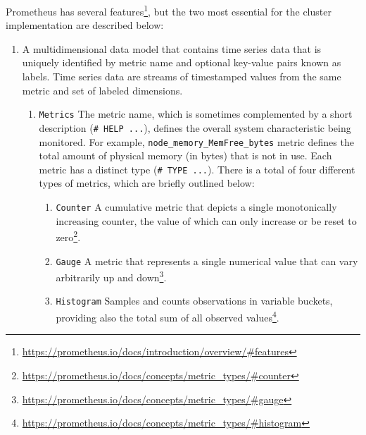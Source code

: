 Prometheus has several features\footnote{\url{https://prometheus.io/docs/introduction/overview/\#features}},
but the two most essential for the cluster implementation are described below\cite{prometheus_overview}:
\begin{enumerate}
  \item A multidimensional data model that contains time series data that is uniquely
    identified by metric name and optional key-value pairs known as labels. Time
    series data are streams of timestamped values from the same metric and set
    of labeled dimensions\cite{prometheus_data_model}.
    \begin{enumerate}
      \item \texttt{Metrics}
        \newline
        The metric name, which is sometimes complemented by a short description (\lstinline[language=prometheus]{# HELP ...}),
        defines the overall system characteristic being monitored.
        \newline
        For example, \lstinline[language=prometheus, alsoletter={_},
        morekeywords={node_memory_MemFree_bytes}]{node_memory_MemFree_bytes}
        metric defines the total amount of physical memory (in bytes) that is
        not in use.
        \newline
        Each metric has a distinct type (\lstinline[language=prometheus]{# TYPE ...}).
        There is a total of four different types of metrics, which are briefly outlined
        below\cite{prometheus_metric_types}:
        \begin{enumerate}
          \item \texttt{Counter}
            \newline
            A cumulative metric that depicts a single monotonically increasing
            counter, the value of which can only increase or be reset to zero\footnote{\url{https://prometheus.io/docs/concepts/metric_types/\#counter}}.

          \item \texttt{Gauge}
            \newline
            A metric that represents a single numerical value that can vary
            arbitrarily up and down\footnote{\url{https://prometheus.io/docs/concepts/metric_types/\#gauge}}.

          \item \texttt{Histogram}
            \newline
            Samples and counts observations in variable buckets, providing also the
            total sum of all observed values\footnote{\url{https://prometheus.io/docs/concepts/metric_types/\#histogram}}.


\end{enumerate}
\end{enumerate}
\end{enumerate}
